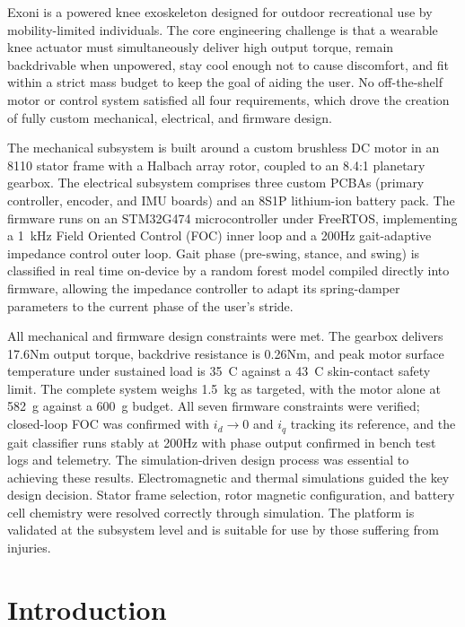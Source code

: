 \documentclass[11pt]{article}
\begin{document}
Exoni is a powered knee exoskeleton designed for outdoor recreational use by mobility-limited individuals. The core engineering challenge is that a wearable knee actuator must simultaneously deliver high output torque, remain backdrivable when unpowered, stay cool enough not to cause discomfort, and fit within a strict mass budget to keep the goal of aiding the user. No off-the-shelf motor or control system satisfied all four requirements, which drove 
the creation of fully custom mechanical, electrical, and firmware design.

The mechanical subsystem is built around a custom brushless DC motor in an 8110 stator frame with a Halbach array rotor, coupled to an 8.4:1 planetary gearbox. The electrical subsystem comprises three custom PCBAs (primary controller, encoder, and IMU boards) and an 8S1P lithium-ion battery pack. The firmware runs on an STM32G474 microcontroller under FreeRTOS, implementing a 1~kHz Field Oriented Control (FOC) inner loop and a 200Hz gait-adaptive impedance control outer loop. Gait phase (pre-swing, stance, and swing) is classified in real time on-device by a random forest model compiled directly into firmware, allowing the impedance controller to adapt its spring-damper parameters to the current phase of the user's stride.

All mechanical and firmware design constraints were met. 
The gearbox delivers 17.6Nm output torque, backdrive resistance is 0.26Nm, and peak motor surface temperature under sustained load is 35~\textdegree{}C against a 43~\textdegree{}C skin-contact safety limit. 
The complete system weighs 1.5~kg as targeted, with the motor alone at 582~g against a 600~g budget. 
All seven firmware constraints were verified; closed-loop FOC was confirmed with $i_d \to 0$ and $i_q$ tracking its reference, 
and the gait classifier runs stably at 200Hz with phase output confirmed in bench test logs and telemetry.
The simulation-driven design process was essential to achieving these results. Electromagnetic and thermal simulations guided the key design decision. 
Stator frame selection, rotor magnetic configuration, and battery cell chemistry were resolved correctly through simulation. 
The platform is validated at the subsystem level and is suitable for use by those suffering from injuries.
\newpage

\section{Introduction}
\end{document}
